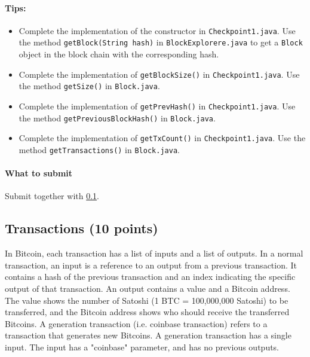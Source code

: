 \documentclass[letterpaper,12pt]{report}
\begin{document}
\paragraph{Tips:}
\begin{itemize}
	\item Complete the implementation of the constructor in \texttt{Checkpoint1.java}. Use the method \texttt{getBlock(String hash)} in \texttt{BlockExplorere.java} to get a \texttt{Block} object in the block chain with the corresponding hash. 
	\item Complete the implementation of \texttt{getBlockSize()} in \texttt{Checkpoint1.java}. Use the method \texttt{getSize()} in \texttt{Block.java}.
	\item Complete the implementation of \texttt{getPrevHash()} in \texttt{Checkpoint1.java}. Use the method \texttt{getPreviousBlockHash()} in \texttt{Block.java}.
	\item Complete the implementation of \texttt{getTxCount()} in \texttt{Checkpoint1.java}. Use the method \texttt{getTransactions()} in \texttt{Block.java}.
\end{itemize}

\paragraph{What to submit} Submit together with \ref{subsec: transactions}.

\subsection{Transactions (10 points)} \label{subsec: transactions}
In Bitcoin, each transaction has a list of inputs and a list of outputs. In a normal transaction, an input is a reference to an output from a previous transaction. It contains a hash of the previous transaction and an index indicating the specific output of that transaction. An output contains a value and a Bitcoin address. The value shows the number of Satoshi (1 BTC = 100,000,000 Satoshi) to be transferred, and the Bitcoin address shows who should receive the transferred Bitcoins. A generation transaction (i.e. coinbase transaction) refers to a transaction that generates new Bitcoins. A generation transaction has a single input. The input has a "coinbase" parameter, and has no previous outputs.
\end{document}
